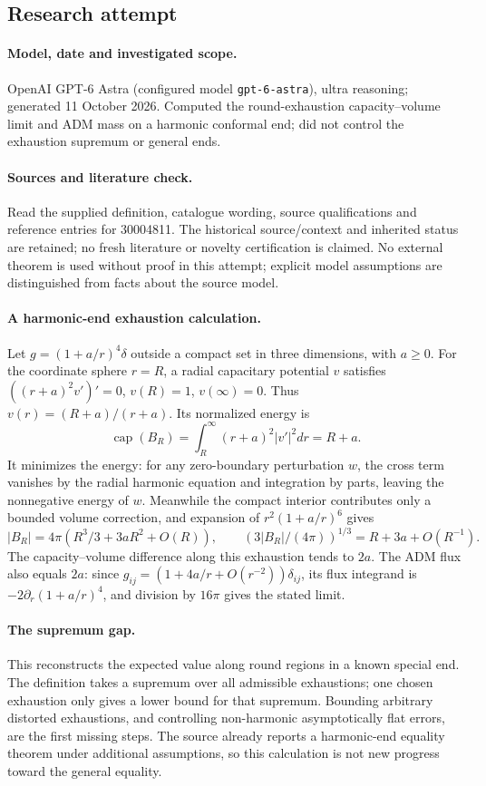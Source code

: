 \documentclass[11pt]{article}
\begin{document}
\subsection{Research attempt}
\paragraph{Model, date and investigated scope.}
OpenAI GPT-6 Astra (configured model \texttt{gpt-6-astra}), ultra reasoning; generated 11 October 2026. Computed the round-exhaustion capacity–volume limit and ADM mass on a harmonic conformal end; did not control the exhaustion supremum or general ends.

\paragraph{Sources and literature check.}
Read the supplied definition, catalogue wording, source qualifications and reference entries for 30004811. The historical source/context and inherited status are retained; no fresh literature or novelty certification is claimed. No external theorem is used without proof in this attempt; explicit model assumptions are distinguished from facts about the source model.

\paragraph{A harmonic-end exhaustion calculation.} Let \(g=(1+a/r)^4\delta\) outside a compact set in three dimensions, with \(a\ge0\). For the coordinate sphere \(r=R\), a radial capacitary potential \(v\) satisfies \(((r+a)^2v')'=0\), \(v(R)=1\), \(v(\infty)=0\). Thus \(v(r)=(R+a)/(r+a)\). Its normalized energy is
\[
 \operatorname{cap}(B_R)=\int_R^\infty(r+a)^2|v'|^2dr=R+a.
\]
It minimizes the energy: for any zero-boundary perturbation \(w\), the cross term vanishes by the radial harmonic equation and integration by parts, leaving the nonnegative energy of \(w\).
Meanwhile the compact interior contributes only a bounded volume correction, and expansion of \(r^2(1+a/r)^6\) gives
\[
 |B_R|=4\pi(R^3/3+3aR^2+O(R)),\qquad
 (3|B_R|/(4\pi))^{1/3}=R+3a+O(R^{-1}).
\]
The capacity--volume difference along this exhaustion tends to \(2a\). The ADM flux also equals \(2a\): since \(g_{ij}=(1+4a/r+O(r^{-2}))\delta_{ij}\), its flux integrand is \(-2\partial_r(1+a/r)^4\), and division by \(16\pi\) gives the stated limit.
\paragraph{The supremum gap.} This reconstructs the expected value along round regions in a known special end. The definition takes a supremum over all admissible exhaustions; one chosen exhaustion only gives a lower bound for that supremum. Bounding arbitrary distorted exhaustions, and controlling non-harmonic asymptotically flat errors, are the first missing steps. The source already reports a harmonic-end equality theorem under additional assumptions, so this calculation is not new progress toward the general equality.
\end{document}
